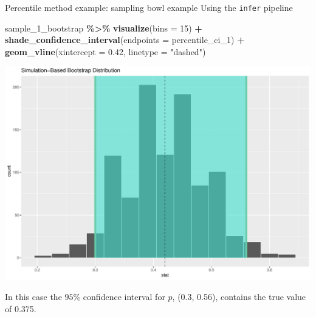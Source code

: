 \documentclass[
  ignorenonframetext,
]{beamer}
\newenvironment{Shaded}{\begin{snugshade}}{\end{snugshade}}
\newcommand{\AttributeTok}[1]{\textcolor[rgb]{0.13,0.29,0.53}{#1}}
\newcommand{\DecValTok}[1]{\textcolor[rgb]{0.00,0.00,0.81}{#1}}
\newcommand{\FloatTok}[1]{\textcolor[rgb]{0.00,0.00,0.81}{#1}}
\newcommand{\FunctionTok}[1]{\textcolor[rgb]{0.13,0.29,0.53}{\textbf{#1}}}
\newcommand{\NormalTok}[1]{#1}
\newcommand{\SpecialCharTok}[1]{\textcolor[rgb]{0.81,0.36,0.00}{\textbf{#1}}}
\newcommand{\StringTok}[1]{\textcolor[rgb]{0.31,0.60,0.02}{#1}}
\begin{document}
\begin{frame}[fragile]{Percentile method example: sampling bowl example}
\protect\hypertarget{percentile-method-example-sampling-bowl-example-1}{}
Using the \texttt{infer} pipeline

\tiny

\begin{Shaded}
\begin{Highlighting}[]
\NormalTok{sample\_1\_bootstrap }\SpecialCharTok{\%\textgreater{}\%} 
  \FunctionTok{visualize}\NormalTok{(}\AttributeTok{bins =} \DecValTok{15}\NormalTok{) }\SpecialCharTok{+} 
  \FunctionTok{shade\_confidence\_interval}\NormalTok{(}\AttributeTok{endpoints =}\NormalTok{ percentile\_ci\_1) }\SpecialCharTok{+}
  \FunctionTok{geom\_vline}\NormalTok{(}\AttributeTok{xintercept =} \FloatTok{0.42}\NormalTok{, }\AttributeTok{linetype =} \StringTok{"dashed"}\NormalTok{)}
\end{Highlighting}
\end{Shaded}

\begin{center}\includegraphics[width=0.7\linewidth,height=0.45\textheight]{Week10_Lect_files/figure-beamer/unnamed-chunk-25-1} \end{center}
\normalsize

In this case the \(95\%\) confidence interval for \(p\), (0.3, 0.56),
contains the true value of 0.375.
\end{frame}
\end{document}
